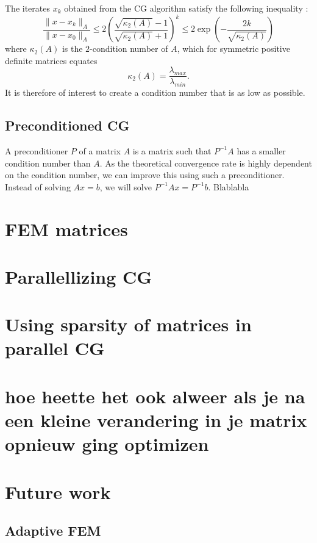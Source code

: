 \documentclass[11pt]{amsart}
\theoremstyle{definition}
\begin{document}
The iterates $x_k$ obtained from the CG algorithm satisfy the following inequality \cite[Slide 23]{sleij}:
\[
  \frac{\|x - x_k\|_A}{\|x - x_0\|_A} \leq 2 \left( \frac{ \sqrt{\kappa_2(A)}-1}{\sqrt{\kappa_2(A)}+1}\right)^k \leq 2 \exp \left( -\frac{2k}{\sqrt{\kappa_2(A)}}\right) 
\]
where $\kappa_2(A)$ is the $2$-condition number of $A$, which for symmetric positive definite matrices equates
\[
  \kappa_2(A) = \frac{\lambda_{max}}{\lambda_{min}}.
\]
It is therefore of interest to create a condition number that is as low as possible.

\subsection{Preconditioned CG}
A preconditioner $P$ of a matrix $A$ is a matrix such that $P^{-1}A$ has a smaller condition number than $A$. As the theoretical convergence rate is highly dependent on the condition number, we can improve this using such a preconditioner. Instead of solving $Ax = b$, we will solve $P^{-1}Ax = P^{-1}b$. Blablabla

\section{FEM matrices}
\section{Parallellizing CG}

\section{Using sparsity of matrices in parallel CG}

\section{hoe heette het ook alweer als je na een kleine verandering in je matrix opnieuw ging optimizen}

\section{Future work}
\subsection{Adaptive FEM}
\end{document}
